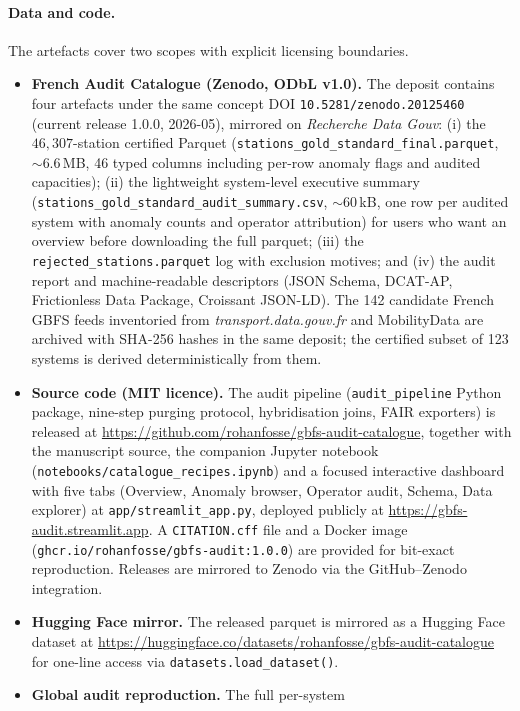 \documentclass[11pt,a4paper]{article}
\begin{document}
\paragraph{Data and code.}
The artefacts cover two scopes with explicit licensing boundaries.
\begin{itemize}[leftmargin=*]
\item \textbf{French Audit Catalogue (Zenodo, ODbL v1.0).} The
deposit contains four artefacts under the same concept DOI
\texttt{10.5281/zenodo.20125460} (current release 1.0.0,
2026-05), mirrored on \emph{Recherche Data Gouv}:
(i) the $46{,}307$-station certified Parquet
(\texttt{stations\_gold\_standard\_final.parquet}, $\sim 6.6$\,MB,
46 typed columns including per-row anomaly flags and audited
capacities);
(ii) the lightweight system-level executive summary
(\texttt{stations\_gold\_standard\_audit\_summary.csv}, $\sim$60\,kB,
one row per audited system with anomaly counts and operator
attribution) for users who want an overview before downloading the
full parquet;
(iii) the \texttt{rejected\_stations.parquet} log with exclusion
motives; and
(iv) the audit report and machine-readable descriptors
(JSON Schema, DCAT-AP, Frictionless Data Package, Croissant JSON-LD).
The 142 candidate French GBFS feeds inventoried from
\emph{transport.data.gouv.fr} and MobilityData are archived with
SHA-256 hashes in the same deposit; the certified subset of 123
systems is derived deterministically from them.
\item \textbf{Source code (MIT licence).} The audit pipeline
(\texttt{audit\_pipeline} Python package, nine-step purging
protocol, hybridisation joins, FAIR exporters) is released at
\url{https://github.com/rohanfosse/gbfs-audit-catalogue},
together with the manuscript source, the companion Jupyter
notebook (\texttt{notebooks/catalogue\_recipes.ipynb}) and a
focused interactive dashboard with five tabs (Overview, Anomaly
browser, Operator audit, Schema, Data explorer) at
\texttt{app/streamlit\_app.py}, deployed publicly at
\url{https://gbfs-audit.streamlit.app}. A
\texttt{CITATION.cff} file and a Docker image
(\texttt{ghcr.io/rohanfosse/gbfs-audit:1.0.0}) are provided for
bit-exact reproduction. Releases are mirrored to Zenodo via the
GitHub--Zenodo integration.
\item \textbf{Hugging Face mirror.} The released parquet is
mirrored as a Hugging Face dataset at
\url{https://huggingface.co/datasets/rohanfosse/gbfs-audit-catalogue}
for one-line access via
\texttt{datasets.load\_dataset()}.
\item \textbf{Global audit reproduction.} The full per-system

\end{itemize}
\end{document}
